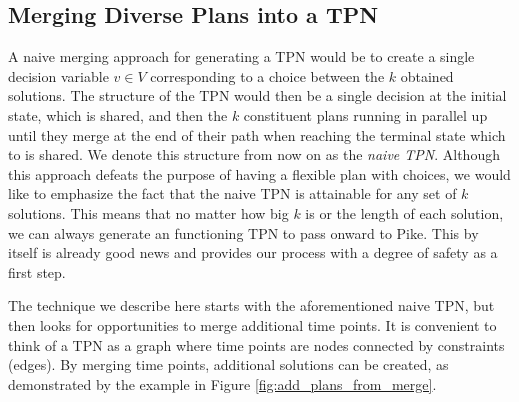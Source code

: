 \subsection{Merging Diverse Plans into a TPN}
\label{generating: merging}
A naive merging approach for generating a TPN would be to create a single decision variable $v \in V$ corresponding to a choice between the $k$ obtained solutions. The structure of the TPN would then be a single decision at the initial state, which is shared, and then the $k$ constituent plans running in parallel up until they merge at the end of their path when reaching the terminal state which to is shared. We denote this structure from now on as the \textit{naive TPN}. 
Although this approach defeats the purpose of having a flexible plan with choices, we would like to emphasize the fact that the naive TPN is attainable for any set of $k$ solutions. This means that no matter how big $k$ is or the length of each solution, we can always generate an functioning TPN to pass onward to Pike. This by itself is already good news and provides our process with a degree of safety as a first step. 
    
The technique we describe here starts with the aforementioned naive TPN, but then looks for opportunities to merge additional time points.
It is convenient to think of a TPN as a graph where time points are nodes connected by constraints (edges).
By merging time points, additional solutions can be created, as demonstrated by the example in Figure \ref{fig:add_plans_from_merge}.

